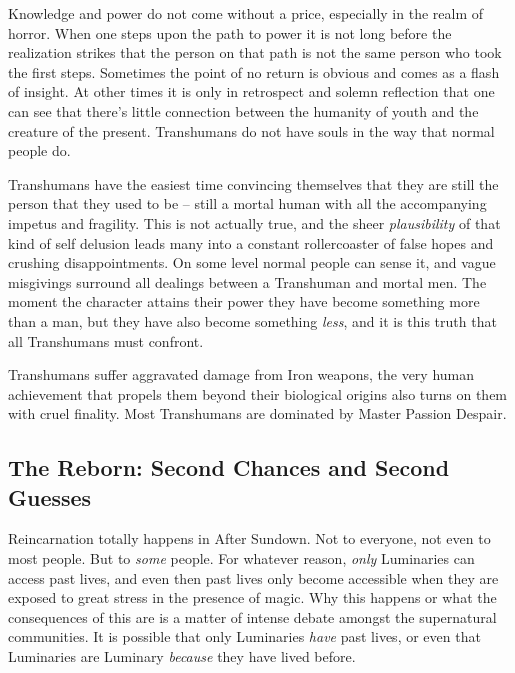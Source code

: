Knowledge and power do not come without a price, especially in the realm of horror. When one steps upon the path to power it is not long before the realization strikes that the person on that path is not the same person who took the first steps. Sometimes the point of no return is obvious and comes as a flash of insight. At other times it is only in retrospect and solemn reflection that one can see that there's little connection between the humanity of youth and the creature of the present. Transhumans do not have souls in the way that normal people do. 

Transhumans have the easiest time convincing themselves that they are still the person that they used to be -- still a mortal human with all the accompanying impetus and fragility. This is not actually true, and the sheer \textit{plausibility} of that kind of self delusion leads many into a constant rollercoaster of false hopes and crushing disappointments. On some level normal people can sense it, and vague misgivings surround all dealings between a Transhuman and mortal men. The moment the character attains their power they have become something more than a man, but they have also become something \textit{less}, and it is this truth that all Transhumans must confront.

Transhumans suffer aggravated damage from Iron weapons, the very human achievement that propels them beyond their biological origins also turns on them with cruel finality. Most Transhumans are dominated by Master Passion Despair. 

\subsection[Reborn]{The Reborn: Second Chances and Second Guesses} 

Reincarnation totally happens in After Sundown. Not to everyone, not even to most people. But to \textit{some} people. For whatever reason, \textit{only} Luminaries can access past lives, and even then past lives only become accessible when they are exposed to great stress in the presence of magic. Why this happens or what the consequences of this are is a matter of intense debate amongst the supernatural communities. It is possible that only Luminaries \textit{have} past lives, or even that Luminaries are Luminary \textit{because} they have lived before.

